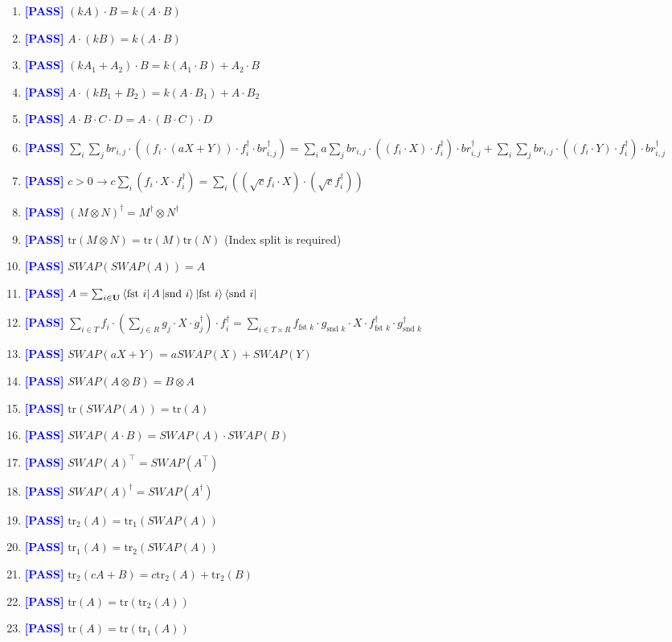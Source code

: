 \documentclass[manuscript, review, timestamp]{acmart}
\newcommand{\tr}{\mathrm{tr}}
\newcommand{\fst}{\textrm{fst }}
\newcommand{\snd}{\textrm{snd }}
\newcommand{\pass}{\textcolor{blue}{\textbf{ [PASS] }}}
\begin{document}
\begin{enumerate}
  \item \pass $(k A) \cdot B = k (A \cdot B)$
  \item \pass $A \cdot (k B) = k (A \cdot B)$
  \item \pass $(k A_1 + A_2) \cdot B = k (A_1 \cdot B) + A_2 \cdot B$
  \item \pass $A \cdot (k B_1 + B_2) = k (A \cdot B_1) + A \cdot B_2$
  \item \pass $A \cdot B \cdot C \cdot D = A \cdot (B \cdot C) \cdot D$
  \item \pass $\sum_i \sum_j br_{i, j} \cdot ((f_i \cdot (a X + Y)) \cdot f_i^\dagger \cdot br_{i, j}^\dagger) = \sum_i a \sum_j br_{i, j} \cdot ((f_i \cdot X) \cdot f_i^\dagger) \cdot br_{i, j}^\dagger + \sum_i \sum_j br_{i, j} \cdot ((f_i \cdot Y) \cdot f_i^\dagger) \cdot br_{i, j}^\dagger$
  \item \pass $c > 0 \to c \sum_i (f_i \cdot X \cdot f_i^\dagger) = \sum_i ((\sqrt{c} f_i \cdot X) \cdot (\sqrt{c} f_i^\dagger))$
  \item \pass $(M \otimes N)^\dagger = M^\dagger \otimes N^\dagger$
  \item \pass $\tr (M \otimes N) = \tr(M) \tr(N)$ (Index split is required)
  \item \pass $SWAP(SWAP(A))=A$
  \item \pass $A = \sum_{i \in \mathbf{U}} \bra{\fst i} A \ket{\snd i} \ket{\fst i} \bra{\snd i}$
  \item \pass $\sum_{i\in T} f_i \cdot (\sum_{j \in R} g_j \cdot X \cdot g_j^\dagger) \cdot f_i^\dagger = \sum_{i \in T\times R} f_{\fst k} \cdot g_{\snd k} \cdot X \cdot f_{\fst k}^\dagger \cdot g_{\snd k}^\dagger$
  \item \pass $SWAP(a X + Y) = a SWAP(X) + SWAP(Y)$
  \item \pass $SWAP(A\otimes B) = B \otimes A$
  \item \pass $\tr(SWAP(A)) = \tr(A)$
  \item \pass $SWAP(A \cdot B) = SWAP(A) \cdot SWAP(B)$
  \item \pass $SWAP(A)^\top = SWAP(A^\top)$
  \item \pass $SWAP(A)^\dagger = SWAP(A^\dagger)$
  \item \pass $\tr_2(A) = \tr_1(SWAP(A))$
  \item \pass $\tr_1(A) = \tr_2(SWAP(A))$
  \item \pass $\tr_2(c A + B) = c \tr_2(A) + \tr_2(B)$
  \item \pass $\tr(A) = \tr(\tr_2(A))$
  \item \pass $\tr(A) = \tr(\tr_1(A))$

\end{enumerate}
\end{document}
